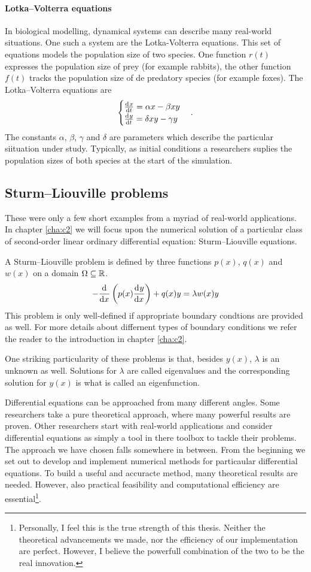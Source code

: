 \paragraph{Lotka--Volterra equations} In biological modelling, dynamical systems can describe many real-world situations. One such a system are the Lotka-Volterra equations. This set of equations models the population size of two species. One function $r(t)$ expresses the population size of prey (for example rabbits), the other function $f(t)$ tracks the population size of de predatory species (for example foxes). The Lotka--Volterra equations are
$$
\begin{cases}
    \dv[]{x}{t} = \alpha x - \beta x y \\
    \dv[]{y}{t} = \delta x y - \gamma y \\
\end{cases}\text{.}
$$
The constants $\alpha$, $\beta$, $\gamma$ and $\delta$ are parameters which describe the particular siituation under study. Typically, as initial conditions a researchers suplies the population sizes of both species at the start of the simulation.

\subsection{Sturm--Liouville problems}

These were only a few short examples from a myriad of real-world applications. In chapter \ref{cha:c2} we will focus upon the numerical solution of a particular class of second-order linear ordinary differential equation: Sturm--Liouville equations.

A Sturm--Liouville problem is defined by three functions $p(x)$, $q(x)$ and $w(x)$ on a domain $\Omega \subseteq \mathbb{R}$.
$$
-{\dv[]{}{x}}\left(p(x) \dv[]{y}{x}\right) + q(x) y = \lambda w(x) y
$$
This problem is only well-defined if appropriate boundary condtions are provided as well. For more details about differnent types of boundary conditions we refer the reader to the introduction in chapter \ref{cha:c2}.

One striking particularity of these problems is that, besides $y(x)$, $\lambda$ is an unknown as well. Solutions for $\lambda$ are called eigenvalues and the corresponding solution for $y(x)$ is what is called an eigenfunction. 

Differential equations can be approached from many different angles. Some researchers take a pure theoretical approach, where many powerful results are proven. Other researchers start with real-world applications and consider differential equations as simply a tool in there toolbox to tackle their problems. The approach we have chosen falls somewhere in between. From the beginning we set out to develop and implement numerical methods for particaular differential equations. To build a useful and accuracte method, many theoretical results are needed. However, also practical feasibility and computational efficiency are essential\footnote{Personally, I feel this is the true strength of this thesis. Neither the theoretical advancements we made, nor the efficiency of our implementation are perfect. However, I believe the powerfull combination of the two to be the real innovation.}.


